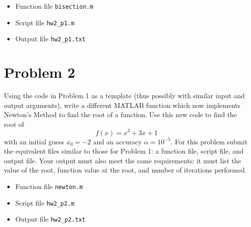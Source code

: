 \begin{solution}
  \quad
  \begin{itemize}
    \item
      Function file \verb|bisection.m|
      
    \item
      Script file \verb|hw2_p1.m|
      
    \item
      Output file \verb|hw2_p1.txt|
      
  \end{itemize}
\end{solution}

\section{Problem 2}%
\label{sec:problem_2}
Using the code in Problem 1 as a template (thus possibly with similar input and output arguments), write a different MATLAB function which now implements Newton's Method to find the root of a function. Use this new code to find the root of
\begin{equation*}
  f(x) = x^{3} + 3x + 1
\end{equation*}
with an initial guess $x_{0} = -2$ and an accuracy $\alpha = 10^{-5}$. For this problem submit the equivalent files similar to those for Problem 1: a function file, script file, and output file. Your output must also meet the same requirements: it must list the value of the root, function value at the root, and number of iterations performed.
\begin{solution}
  \quad
  \begin{itemize}
    \item
      Function file \verb|newton.m|
      
    \item
      Script file \verb|hw2_p2.m|
      
    \item
      Output file \verb|hw2_p2.txt|
      
  \end{itemize}
\end{solution}

